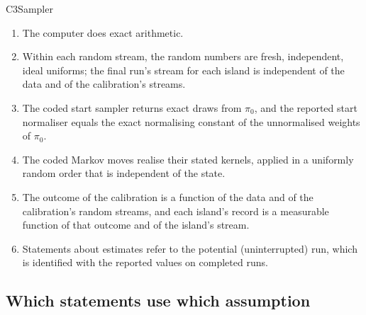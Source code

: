 \begin{convention}{C3}{Sampler}
\begin{enumerate}[label=(\roman*),leftmargin=2em,itemsep=1pt]
  \item The computer does exact arithmetic.
  \item Within each random stream, the random numbers are fresh, independent, ideal uniforms; the final run's stream for
    each island is independent of the data and of the calibration's streams.
  \item The coded start sampler returns exact draws from $\pi_0$, and the reported start normaliser equals the exact
    normalising constant of the unnormalised weights of $\pi_0$.
  \item The coded Markov moves realise their stated kernels, applied in a uniformly random order that is independent of
    the state.
  \item The outcome of the calibration is a function of the data and of the calibration's random streams, and each island's
    record is a measurable function of that outcome and of the island's stream.
  \item Statements about estimates refer to the potential (uninterrupted) run, which is identified with the reported
    values on completed runs.
\end{enumerate}
\end{convention}

\subsection{Which statements use which assumption}\label{sec:usage}


